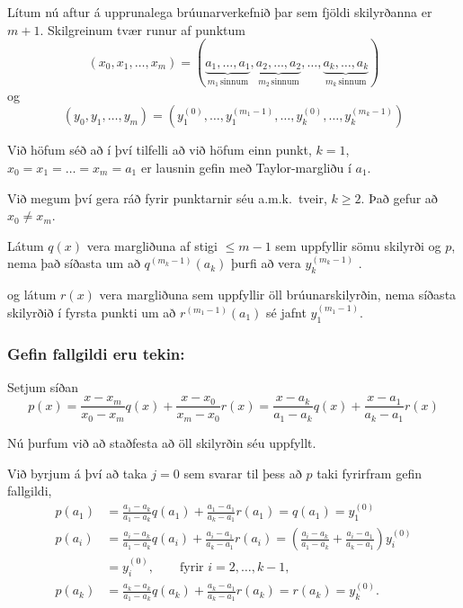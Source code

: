 \documentclass[icelandic,a4paper,12pt]{article}
\begin{document}
\pause
\smallskip
Lítum nú aftur á upprunalega brúunarverkefnið þar sem fjöldi
skilyrðanna er $m+1$.   Skilgreinum tvær runur af punktum
\begin{equation*}
  (x_0,x_1,\ldots,x_m) = 
  (\underbrace{a_1, \ldots, a_1}_{m_1 \, \text{sinnum}}, 
  \underbrace{a_2, \ldots , a_2}_{m_2 \, \text{sinnum}}, 
  \ldots , 
  \underbrace{a_k, \ldots , a_k}_{m_k \, \text{sinnum}}) 
\end{equation*}
og
\begin{equation*}
  (y_0,y_1,\ldots,y_m) = 
  (y_1^{(0)}, \ldots, y_1^{(m_1-1)}, \ldots,
  y_k^{(0)}, \ldots, y_k^{(m_k-1)})
\end{equation*}

\pause
\smallskip
Við höfum séð að í því tilfelli að við höfum einn punkt, $k=1$,  
$x_0 = x_1 = \ldots = x_m = a_1$  er lausnin gefin 
með Taylor-margliðu í $a_1$. 


Við megum því gera ráð fyrir  punktarnir séu a.m.k.\ tveir,
$k\geq 2$.  Það gefur að $x_0 \not= x_m$.

\pause
\smallskip
Látum $q(x)$ vera margliðuna af stigi $\leq m-1$ sem uppfyllir sömu
skilyrði og $p$, nema það síðasta um að $q^{(m_k-1)}(a_k)$ þurfi að
vera $y_k^{(m_k-1)}$ .

\pause
\smallskip
og látum $r(x)$ vera margliðuna sem uppfyllir öll brúunarskilyrðin,
nema síðasta skilyrðið í fyrsta punkti um 
að $r^{(m_1-1)}(a_1)$ sé jafnt $y_1^{(m_1-1)}$. 



\subsubsection{Gefin fallgildi eru tekin:}
Setjum síðan
$$
  p(x) = \frac{x-x_m}{x_0-x_m}q(x) 
  + \frac{x-x_0}{x_m-x_0}r(x)
  = \frac{x-a_k}{a_1-a_k}q(x)
  + \frac{x-a_1}{a_k-a_1}r(x)
$$

\pause
Nú þurfum við að staðfesta að öll skilyrðin séu uppfyllt.  

\pause
\smallskip
Við byrjum á því að taka $j=0$ sem svarar til þess að
$p$ taki fyrirfram gefin fallgildi,
\begin{align*}
  p(a_1) &= \frac{a_1-a_k}{a_1-a_k}q(a_1)
  + \frac{a_1-a_1}{a_k-a_1}r(a_1) = q(a_1) = y_1^{(0)}\\
  p(a_i) &= \frac{a_i-a_k}{a_1-a_k}q(a_i)
  + \frac{a_i-a_1}{a_k-a_1}r(a_i) 
  = \left( \frac{a_i-a_k}{a_1-a_k} 
    + \frac{a_i-a_1}{a_k-a_1} \right) y_i^{(0)} \\
    &= y_i^{(0)},  \qquad \text{fyrir } i=2,\ldots,k-1,\\
  p(a_k) &= \frac{a_k-a_k}{a_1-a_k}q(a_k)
  + \frac{a_k-a_1}{a_k-a_1}r(a_k) = r(a_k) = y_k^{(0)}.
\end{align*}
\end{document}
